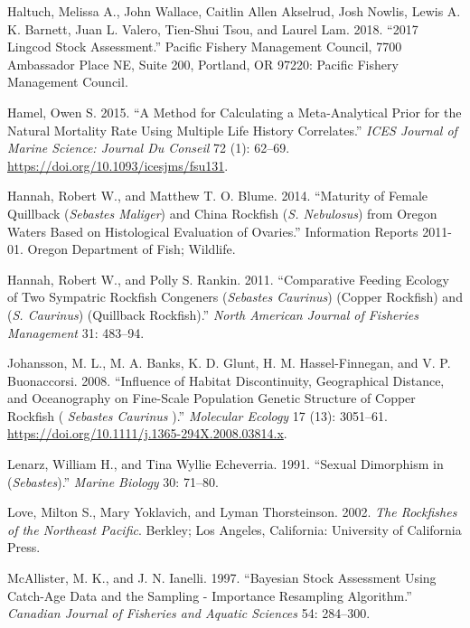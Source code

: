 \documentclass[11pt,
  english,
  a4paper,
]{article}
\begin{document}
\leavevmode\hypertarget{ref-haltuch_lingcod_2018}{}%
Haltuch, Melissa A., John Wallace, Caitlin Allen Akselrud, Josh Nowlis, Lewis A. K. Barnett, Juan L. Valero, Tien-Shui Tsou, and Laurel Lam. 2018. ``2017 Lingcod Stock Assessment.'' Pacific Fishery Management Council, 7700 Ambassador Place NE, Suite 200, Portland, OR 97220: Pacific Fishery Management Council.

\leavevmode\hypertarget{ref-hamel_method_2015}{}%
Hamel, Owen S. 2015. ``A Method for Calculating a Meta-Analytical Prior for the Natural Mortality Rate Using Multiple Life History Correlates.'' \emph{ICES Journal of Marine Science: Journal Du Conseil} 72 (1): 62--69. \url{https://doi.org/10.1093/icesjms/fsu131}.

\leavevmode\hypertarget{ref-HannahandBlume_maturity_2011}{}%
Hannah, Robert W., and Matthew T. O. Blume. 2014. ``Maturity of Female Quillback (\emph{Sebastes Maliger}) and China Rockfish (\emph{S. Nebulosus}) from Oregon Waters Based on Histological Evaluation of Ovaries.'' Information Reports 2011-01. Oregon Department of Fish; Wildlife.

\leavevmode\hypertarget{ref-HannahandRankin_rockfish_site_fidelity_2011}{}%
Hannah, Robert W., and Polly S. Rankin. 2011. ``Comparative Feeding Ecology of Two Sympatric Rockfish Congeners (\emph{Sebastes Caurinus}) (Copper Rockfish) and (\emph{S. Caurinus}) (Quillback Rockfish).'' \emph{North American Journal of Fisheries Management} 31: 483--94.

\leavevmode\hypertarget{ref-johansson_influence_2008}{}%
Johansson, M. L., M. A. Banks, K. D. Glunt, H. M. Hassel-Finnegan, and V. P. Buonaccorsi. 2008. ``Influence of Habitat Discontinuity, Geographical Distance, and Oceanography on Fine-Scale Population Genetic Structure of Copper Rockfish ( \emph{Sebastes Caurinus} ).'' \emph{Molecular Ecology} 17 (13): 3051--61. \url{https://doi.org/10.1111/j.1365-294X.2008.03814.x}.

\leavevmode\hypertarget{ref-LenarzandEcheverria_dimorphism_1991}{}%
Lenarz, William H., and Tina Wyllie Echeverria. 1991. ``Sexual Dimorphism in (\emph{Sebastes}).'' \emph{Marine Biology} 30: 71--80.

\leavevmode\hypertarget{ref-loveetal_2002}{}%
Love, Milton S., Mary Yoklavich, and Lyman Thorsteinson. 2002. \emph{The Rockfishes of the Northeast Pacific}. Berkley; Los Angeles, California: University of California Press.

\leavevmode\hypertarget{ref-mcallister_bayesian_1997}{}%
McAllister, M. K., and J. N. Ianelli. 1997. ``Bayesian Stock Assessment Using Catch-Age Data and the Sampling - Importance Resampling Algorithm.'' \emph{Canadian Journal of Fisheries and Aquatic Sciences} 54: 284--300.
\end{document}

